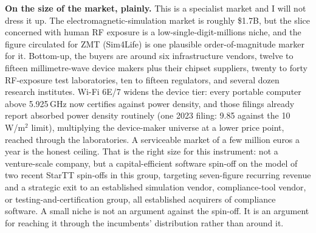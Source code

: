 \documentclass[10pt,a4paper]{article}
\begin{document}
\textbf{On the size of the market, plainly.} This is a specialist market and I will not dress it up. The
electromagnetic-simulation market is roughly \$1.7B, but the slice concerned
with human RF exposure is a low-single-digit-millions niche, and the figure circulated for ZMT (Sim4Life) is one plausible
order-of-magnitude marker for it. Bottom-up, the buyers are around six infrastructure vendors, twelve to fifteen millimetre-wave
device makers plus their chipset suppliers, twenty to forty RF-exposure test laboratories, ten to fifteen regulators, and several
dozen research institutes. Wi-Fi 6E/7 widens the device tier: every portable computer above 5.925\,GHz now certifies
against power density, and those filings already report absorbed power density routinely (one 2023 filing:
9.85 against the 10\,W/m$^2$ limit), multiplying the device-maker universe at a lower price point, reached
through the laboratories. A serviceable market of a few million
euros a year is the honest ceiling. That is the right size for
this instrument: not a venture-scale company, but a capital-efficient software spin-off on the model of two recent StarTT spin-offs
in this group, targeting seven-figure recurring revenue and a strategic exit to an established simulation vendor, compliance-tool
vendor, or testing-and-certification group, all established acquirers of compliance software.
A small niche is not an argument against the spin-off. It is an argument for reaching it through the incumbents' distribution rather
than around it.
\end{document}
